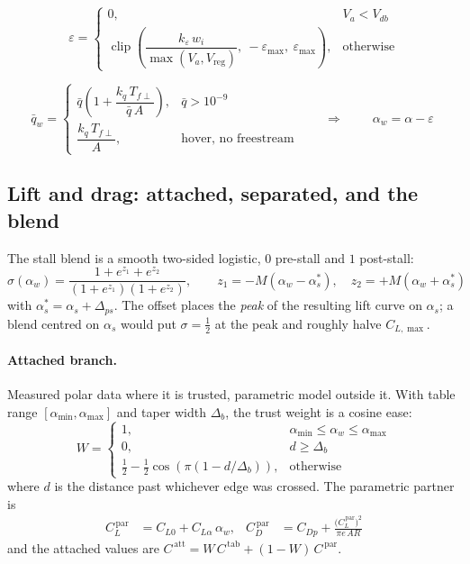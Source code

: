 \documentclass[11pt,a4paper]{article}
\newcommand{\clip}{\operatorname{clip}}
\begin{document}
\begin{equation}
\varepsilon=
\begin{cases}
0, & V_a<V_{db}\\[1mm]
\clip\!\left(\dfrac{k_\varepsilon\,w_i}{\max(V_a,V_{\!\mathrm{reg}})},
\ -\varepsilon_{\max},\ \varepsilon_{\max}\right), & \text{otherwise}
\end{cases}
\end{equation}

\begin{equation}
\bar q_w=
\begin{cases}
\bar q\left(1+\dfrac{k_q\,T_{f\perp}}{\bar q\,A}\right), & \bar q>10^{-9}\\[3mm]
\dfrac{k_q\,T_{f\perp}}{A}, & \text{hover, no freestream}
\end{cases}
\qquad\Longrightarrow\qquad
\boxed{\;\alpha_w=\alpha-\varepsilon\;}
\end{equation}

\subsection{Lift and drag: attached, separated, and the blend}
The stall blend is a smooth two-sided logistic, $0$ pre-stall and $1$ post-stall:
\begin{equation}
\sigma(\alpha_w)=\frac{1+e^{z_1}+e^{z_2}}{\left(1+e^{z_1}\right)\left(1+e^{z_2}\right)},
\qquad
z_1=-M\!\left(\alpha_w-\alpha_s^{*}\right),\quad
z_2=+M\!\left(\alpha_w+\alpha_s^{*}\right)
\end{equation}
with $\alpha_s^{*}=\alpha_{s}+\Delta_{ps}$. The offset places the \emph{peak} of
the resulting lift curve on $\alpha_s$; a blend centred on $\alpha_s$ would put
$\sigma=\tfrac12$ at the peak and roughly halve $C_{L,\max}$.

\paragraph{Attached branch.} Measured polar data where it is trusted, parametric
model outside it. With table range $[\alpha_{\min},\alpha_{\max}]$ and taper
width $\Delta_b$, the trust weight is a cosine ease:
\begin{equation}
W=
\begin{cases}
1, & \alpha_{\min}\le\alpha_w\le\alpha_{\max}\\[1mm]
0, & d\ge\Delta_b\\[1mm]
\tfrac12-\tfrac12\cos\!\left(\pi\left(1-d/\Delta_b\right)\right), & \text{otherwise}
\end{cases}
\end{equation}
where $d$ is the distance past whichever edge was crossed. The parametric
partner is
\begin{align}
C_{L}^{\,\mathrm{par}}&=C_{L0}+C_{L\alpha}\,\alpha_w, &
C_{D}^{\,\mathrm{par}}&=C_{Dp}+\frac{\bigl(C_{L}^{\,\mathrm{par}}\bigr)^{2}}{\pi e\,A\!R}
\end{align}
and the attached values are $C^{\,\mathrm{att}}=W\,C^{\,\mathrm{tab}}+(1-W)\,C^{\,\mathrm{par}}$.
\end{document}
